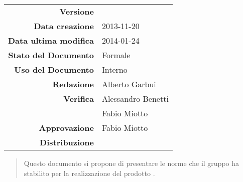 



\newcommand{\Versione}{\versioneNormeDiProgetto{}}	%
\newcommand{\Data}{2013-11-20}						%
\newcommand{\DataUltimaModifica}{2014-01-24}
\newcommand{\TipoDocumento}{Norme di Progetto}		%



\begin{center}
\begin{tabular}{r|l}
\textbf{Versione} & \Versione{} \\
\textbf{Data creazione} & \Data{} \\
\textbf{Data ultima modifica} & \DataUltimaModifica{} \\
\textbf{Stato del Documento} & Formale \\		%
\textbf{Uso del Documento} & Interno \\			%
\textbf{Redazione} & Alberto Garbui\\			%
\textbf{Verifica} & Alessandro Benetti \\
& Fabio Miotto\\			%
\textbf{Approvazione} & Fabio Miotto \\			%
\textbf{Distribuzione} & \parbox[t]{4cm}{\NomeGruppo{}}\\
\end{tabular}
\end{center}

\vspace{0.05in}

\begin{abstract}
\begin{center}
Questo documento si propone di presentare le norme che il gruppo \NomeGruppo{} ha stabilito per la realizzazione del prodotto \Progetto{}.
\end{center}
\end{abstract}

